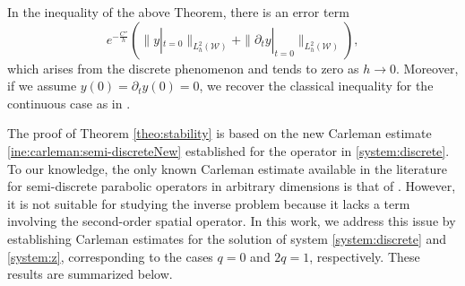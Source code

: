 \documentclass{amsart}
\numberwithin{equation}{section}
\begin{document}
In the inequality of the above Theorem, there is an error term $$e^{-\frac{C''}{h}}\left(\|y|_{t=0}\|_{L^2_h(\mathcal{W})}+\|\partial_{t}y|_{t=0}\|_{L^2_h(\mathcal{W})}\right),$$ which arises from the discrete phenomenon and tends to zero as $h\to 0$. Moreover, if we assume $y(0)=\partial_ty(0)=0$, we recover the classical inequality for the continuous case as in \cite{IY-1998}.

The proof of Theorem \ref{theo:stability} is based on the new Carleman estimate \eqref{ine:carleman:semi-discreteNew} established for the operator in \eqref{system:discrete}. To our knowledge, the only known Carleman estimate available in the literature for semi-discrete parabolic operators in arbitrary dimensions is that of \cite{BLR-2014}. However, it is not suitable for studying the inverse problem because it lacks a  term involving the second-order spatial operator. In this work, we address this issue by establishing Carleman estimates for the solution of system \eqref{system:discrete} and \eqref{system:z}, corresponding to the cases $q=0$ and $2q=1$, respectively. These results are summarized below.
\end{document}

